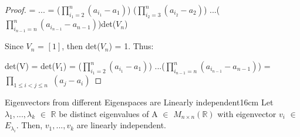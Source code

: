 \begin{proof}
        \hspace{1.9cm}
        = ...
        = ($\prod_{i_1=2}^n (a_{i_1} - a_1)$)
            ($\prod_{i_2=3}^n (a_{i_2} - a_2)$)
            ...($\prod_{i_{n-1}=n}^n (a_{i_{n-1}} - a_{n-1})$)det($V_n$)

        Since $V_n$ = $[1]$, then det($V_n$) = 1. Thus:

        \hspace{0.5cm}
        det(V) = det($V_1$)
        = ($\prod_{i_1=2}^n (a_{i_1} - a_1)$)
            ...($\prod_{i_{n-1}=n}^n (a_{i_{n-1}} - a_{n-1})$)
        = $\prod_{1 \leq i < j \leq n}$ $(a_j - a_i)$
    \end{proof}

    \vspace{0.5cm}



    \begin{wtheorem}{Eigenvectors from different Eigenspaces are
    Linearly independent}{16cm}
        Let $\lambda_1,...,\lambda_k$ $\in$ $\mathbb{R}$ be distinct
        eigenvalues of A $\in$ $M_{n \times n}(\mathbb{R})$
        with eigenvector $v_i$ $\in$ $E_{\lambda_i}$.
        Then, $v_1,...,v_k$ are linearly independent.
    \end{wtheorem}

